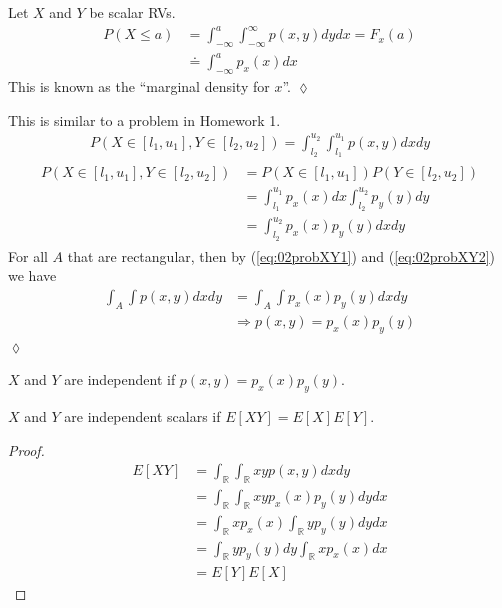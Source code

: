 \documentclass[lecture,12pt,]{pcms-l}
\begin{document}
\begin{example}
Let $X$ and $Y$ be scalar RVs.
\begin{align*}
P(X\leq a) &= \int_{-\infty}^a \int_{-\infty}^\infty p(x,y)dydx = F_x(a) \\
&\doteq \int_{-\infty}^a p_x(x)dx
\end{align*}
This is known as the ``marginal density for $x$''.
$\lozenge$
\end{example}

\begin{example}
This is similar to a problem in Homework 1.
\begin{align}
\label{eq:02probXY1}
P(X\in[l_1,u_1], Y\in[l_2,u_2]) = \int_{l_2}^{u_2} \int_{l_1}^{u_1} p(x,y)dxdy
\end{align}
\begin{align}
\label{eq:02probXY2}
\begin{split}
P(X\in[l_1,u_1], Y\in[l_2,u_2]) &= P(X\in[l_1,u_1]) P(Y\in[l_2,u_2]) \\
&= \int_{l_1}^{u_1}p_x(x)dx \int_{l_2}^{u_2}p_y(y)dy \\
&= \int_{l_2}^{u_2}p_x(x)p_y(y)dxdy
\end{split}
\end{align}
For all $A$ that are rectangular, then by (\ref{eq:02probXY1}) and (\ref{eq:02probXY2}) we have
\begin{align*}
\int_A\int p(x,y)dxdy &= \int_A\int p_x(x)p_y(y)dxdy \\
&\Rightarrow p(x,y) = p_x(x)p_y(y)
\end{align*}
$\lozenge$
\end{example}

\begin{theorem}
$X$ and $Y$ are independent if $p(x,y) = p_x(x)p_y(y)$.
\end{theorem}

\begin{theorem}
$X$ and $Y$ are independent scalars if $E[XY] = E[X]E[Y]$.
\end{theorem}

\begin{proof}
\begin{align*}
E[XY] &= \int_\mathbb{R}\int_\mathbb{R} xyp(x,y)dxdy \\
&= \int_\mathbb{R}\int_\mathbb{R} xyp_x(x)p_y(y)dydx \\
&= \int_\mathbb{R} xp_x(x)\int_\mathbb{R} yp_y(y)dydx \\
&= \int_\mathbb{R} yp_y(y)dy \int_\mathbb{R} xp_x(x)dx \\
&= E[Y]E[X]
\end{align*}
\end{proof}
\end{document}

